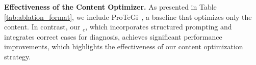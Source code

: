 

\noindent \textbf{Effectiveness of the Content Optimizer.}
As presented in Table \ref{tab:ablation_format}, we include ProTeGi~\citep{C_2023EMNLP_APO}, a baseline that optimizes only the content. In contrast, our \sysname{}$_{c}$, which incorporates structured prompting and integrates correct cases for diagnosis, achieves significant performance improvements, which highlights the effectiveness of our content optimization strategy.